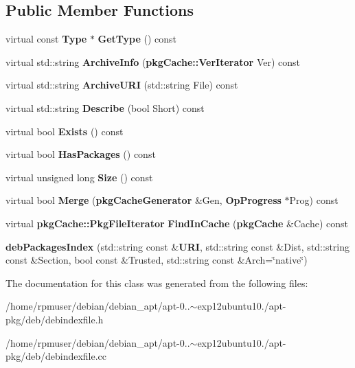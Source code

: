 \subsection*{\-Public \-Member \-Functions}
\begin{DoxyCompactItemize}
\item 
virtual const {\bf \-Type} $\ast$ {\bfseries \-Get\-Type} () const \label{classdebPackagesIndex_a97e9791ce2bb129d7b03dfe2f55de366}

\item 
virtual std\-::string {\bfseries \-Archive\-Info} ({\bf pkg\-Cache\-::\-Ver\-Iterator} \-Ver) const \label{classdebPackagesIndex_a53805b4bd2419bdd8e6ec00d3e97b56e}

\item 
virtual std\-::string {\bfseries \-Archive\-U\-R\-I} (std\-::string \-File) const \label{classdebPackagesIndex_ac797e5aad2fdbc2462e14647d924185e}

\item 
virtual std\-::string {\bfseries \-Describe} (bool \-Short) const \label{classdebPackagesIndex_a1d76db0d4174d2926a4c5af85e1019d9}

\item 
virtual bool {\bfseries \-Exists} () const \label{classdebPackagesIndex_aa746a17c5bebccb81d72dccb29948ec4}

\item 
virtual bool {\bfseries \-Has\-Packages} () const \label{classdebPackagesIndex_a3529b24d8d4f049bd120b93d56d467d0}

\item 
virtual unsigned long {\bfseries \-Size} () const \label{classdebPackagesIndex_ab1050fe2604ef4e6cba6491de8a9f708}

\item 
virtual bool {\bfseries \-Merge} ({\bf pkg\-Cache\-Generator} \&\-Gen, {\bf \-Op\-Progress} $\ast$\-Prog) const \label{classdebPackagesIndex_a7055ce0e05b5bcf6fad25971d5e3c9e4}

\item 
virtual {\bf pkg\-Cache\-::\-Pkg\-File\-Iterator} {\bfseries \-Find\-In\-Cache} ({\bf pkg\-Cache} \&\-Cache) const \label{classdebPackagesIndex_afa0e20f879d9090dac2a7a4830bc7015}

\item 
{\bfseries deb\-Packages\-Index} (std\-::string const \&{\bf \-U\-R\-I}, std\-::string const \&\-Dist, std\-::string const \&\-Section, bool const \&\-Trusted, std\-::string const \&\-Arch=\char`\"{}native\char`\"{})\label{classdebPackagesIndex_a9c3cc7b77975774604f849b84640444e}

\end{DoxyCompactItemize}


\-The documentation for this class was generated from the following files\-:\begin{DoxyCompactItemize}
\item 
/home/rpmuser/debian/debian\-\_\-apt/apt-\/0..$\sim$exp12ubuntu10./apt-\/pkg/deb/debindexfile.\-h\item 
/home/rpmuser/debian/debian\-\_\-apt/apt-\/0..$\sim$exp12ubuntu10./apt-\/pkg/deb/debindexfile.\-cc\end{DoxyCompactItemize}
